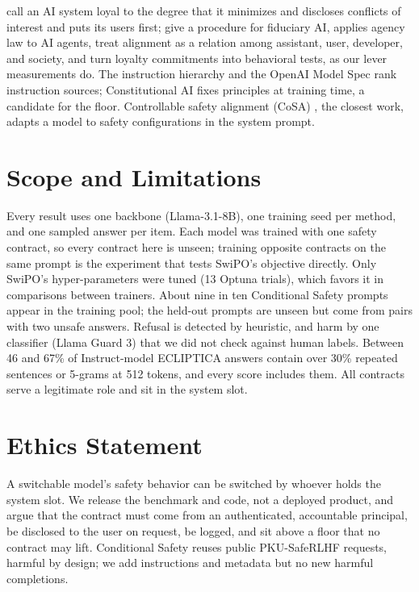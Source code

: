 \documentclass[letterpaper]{article} %
\begin{document}
\citet{aguirre2020loyalty} call an AI system loyal to the degree that it minimizes and discloses conflicts of interest and puts its users first; \citet{benthall2023fiduciary} give a procedure for fiduciary AI, \citet{kolt2025governing} applies agency law to AI agents, \citet{gabriel2024ethics} treat alignment as a relation among assistant, user, developer, and society, and \citet{greenwood2026loyalevals} turn loyalty commitments into behavioral tests, as our lever measurements do. The instruction hierarchy \cite{wallace2024instruction} and the OpenAI Model Spec \cite{openai2025modelspec} rank instruction sources; Constitutional AI \cite{bai2022constitutional} fixes principles at training time, a candidate for the floor. Controllable safety alignment (CoSA) \cite{zhang2025cosa}, the closest work, adapts a model to safety configurations in the system prompt.

\section{Scope and Limitations}

Every result uses one backbone (Llama-3.1-8B), one training seed per method, and one sampled answer per item. Each model was trained with one safety contract, so every contract here is unseen; training opposite contracts on the same prompt is the experiment that tests SwiPO's objective directly. Only SwiPO's hyper-parameters were tuned (13 Optuna trials), which favors it in comparisons between trainers. About nine in ten Conditional Safety prompts appear in the training pool; the held-out prompts are unseen but come from pairs with two unsafe answers. Refusal is detected by heuristic, and harm by one classifier (Llama Guard 3) that we did not check against human labels. Between 46 and 67\% of Instruct-model ECLIPTICA answers contain over 30\% repeated sentences or 5-grams at 512 tokens, and every score includes them. All contracts serve a legitimate role and sit in the system slot.

\section{Ethics Statement}

A switchable model's safety behavior can be switched by whoever holds the system slot. We release the benchmark and code, not a deployed product, and argue that the contract must come from an authenticated, accountable principal, be disclosed to the user on request, be logged, and sit above a floor that no contract may lift. Conditional Safety reuses public PKU-SafeRLHF requests, harmful by design; we add instructions and metadata but no new harmful completions.
\end{document}
